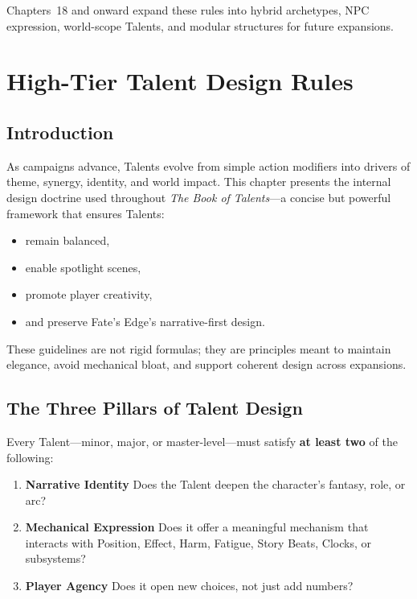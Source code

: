 \documentclass[11pt]{book}
\begin{document}
Chapters~18 and onward expand these rules into hybrid archetypes, NPC expression,
world-scope Talents, and modular structures for future expansions.


\chapter{High-Tier Talent Design Rules}

\section{Introduction}

As campaigns advance, Talents evolve from simple action modifiers
into drivers of theme, synergy, identity, and world impact.
This chapter presents the internal design doctrine used throughout
\emph{The Book of Talents}---a concise but powerful framework
that ensures Talents:
\begin{itemize}
    \item remain balanced,
    \item enable spotlight scenes,
    \item promote player creativity,
    \item and preserve Fate's Edge's narrative-first design.
\end{itemize}

These guidelines are not rigid formulas;
they are principles meant to maintain elegance,
avoid mechanical bloat, and support coherent design across expansions.

\section{The Three Pillars of Talent Design}

Every Talent---minor, major, or master-level---must satisfy
\textbf{at least two} of the following:

\begin{enumerate}
    \item \textbf{Narrative Identity}  
    Does the Talent deepen the character's fantasy, role, or arc?

    \item \textbf{Mechanical Expression}  
    Does it offer a meaningful mechanism that interacts with
    Position, Effect, Harm, Fatigue, Story Beats, Clocks, or subsystems?

    \item \textbf{Player Agency}  
    Does it open new choices, not just add numbers?
\end{enumerate}
\end{document}
